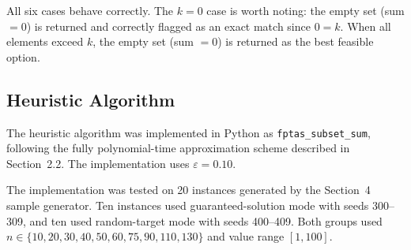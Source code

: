\documentclass[12pt,a4paper]{article}
\theoremstyle{definition}
\begin{document}
All six cases behave correctly. The $k = 0$ case is worth noting: the empty
set (sum $= 0$) is returned and correctly flagged as an exact match since
$0 = k$. When all elements exceed $k$, the empty set (sum $= 0$) is returned
as the best feasible option.

\subsection{Heuristic Algorithm}


The heuristic algorithm was implemented in Python as \texttt{fptas\_subset\_sum},
following the fully polynomial-time approximation scheme described in Section~2.2.
The implementation uses \(\varepsilon = 0.10\).

The implementation was tested on 20 instances generated by the Section~4 sample
generator. Ten instances used guaranteed-solution mode with seeds 300--309, and ten
used random-target mode with seeds 400--409. Both groups used
\(n \in \{10,20,30,40,50,60,75,90,110,130\}\) and value range \([1,100]\).
\end{document}

